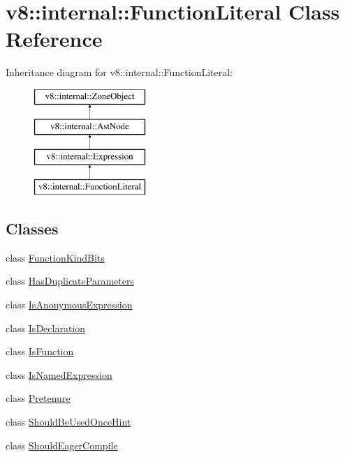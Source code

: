 \hypertarget{classv8_1_1internal_1_1_function_literal}{}\section{v8\+:\+:internal\+:\+:Function\+Literal Class Reference}
\label{classv8_1_1internal_1_1_function_literal}
Inheritance diagram for v8\+:\+:internal\+:\+:Function\+Literal\+:\begin{figure}[H]
\begin{center}
\leavevmode
\includegraphics[height=4.000000cm]{classv8_1_1internal_1_1_function_literal}
\end{center}
\end{figure}
\subsection*{Classes}
\begin{DoxyCompactItemize}
\item 
class \hyperlink{classv8_1_1internal_1_1_function_literal_1_1_function_kind_bits}{Function\+Kind\+Bits}
\item 
class \hyperlink{classv8_1_1internal_1_1_function_literal_1_1_has_duplicate_parameters}{Has\+Duplicate\+Parameters}
\item 
class \hyperlink{classv8_1_1internal_1_1_function_literal_1_1_is_anonymous_expression}{Is\+Anonymous\+Expression}
\item 
class \hyperlink{classv8_1_1internal_1_1_function_literal_1_1_is_declaration}{Is\+Declaration}
\item 
class \hyperlink{classv8_1_1internal_1_1_function_literal_1_1_is_function}{Is\+Function}
\item 
class \hyperlink{classv8_1_1internal_1_1_function_literal_1_1_is_named_expression}{Is\+Named\+Expression}
\item 
class \hyperlink{classv8_1_1internal_1_1_function_literal_1_1_pretenure}{Pretenure}
\item 
class \hyperlink{classv8_1_1internal_1_1_function_literal_1_1_should_be_used_once_hint}{Should\+Be\+Used\+Once\+Hint}
\item 
class \hyperlink{classv8_1_1internal_1_1_function_literal_1_1_should_eager_compile}{Should\+Eager\+Compile}
\end{DoxyCompactItemize}
